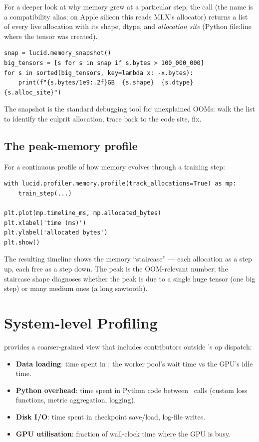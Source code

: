 For a deeper look at why memory grew at a particular step, the
 call (the name is
a compatibility alias; on Apple silicon this reads MLX's
allocator) returns a list of every live allocation with its
shape, dtype, and \emph{allocation site} (Python file:line where
the tensor was created).

\begin{lstlisting}[style=lucid,language=LucidPython]
snap = lucid.memory_snapshot()
big_tensors = [s for s in snap if s.bytes > 100_000_000]
for s in sorted(big_tensors, key=lambda x: -x.bytes):
    print(f"{s.bytes/1e9:.2f}GB  {s.shape}  {s.dtype}  {s.alloc_site}")
\end{lstlisting}

The snapshot is the standard debugging tool for unexplained
OOMs: walk the list to identify the culprit allocation, trace
back to the code site, fix.

\subsection{The peak-memory profile}
\label{ssec:profiler_determinism:peak_profile}

For a continuous profile of how memory evolves through a
training step:

\begin{lstlisting}[style=lucid,language=LucidPython]
with lucid.profiler.memory.profile(track_allocations=True) as mp:
    train_step(...)

plt.plot(mp.timeline_ms, mp.allocated_bytes)
plt.xlabel('time (ms)')
plt.ylabel('allocated bytes')
plt.show()
\end{lstlisting}

The resulting timeline shows the memory ``staircase'' --- each
allocation as a step up, each free as a step down. The peak is
the OOM-relevant number; the staircase shape diagnoses whether
the peak is due to a single huge tensor (one big step) or many
medium ones (a long sawtooth).

\section{System-level Profiling}
\label{sec:profiler_determinism:system_profile}

 provides a coarser-grained view
that includes contributors outside \Lucid's op dispatch:

\begin{itemize}
  \item \textbf{Data loading}: time spent in
    ; the worker pool's wait
    time vs the GPU's idle time.
  \item \textbf{Python overhead}: time spent in Python code
    between \Lucid\ calls (custom loss functions, metric
    aggregation, logging).
  \item \textbf{Disk I/O}: time spent in checkpoint save/load,
    log-file writes.
  \item \textbf{GPU utilisation}: fraction of wall-clock time
    where the GPU is busy.
\end{itemize}

